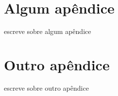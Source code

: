 \begin{apendicesenv}
    
    \partapendices
    
    \chapter{Algum apêndice}
    
    escreve sobre algum apêndice
    
    \chapter{Outro apêndice}

    escreve sobre outro apêndice
    
\end{apendicesenv}
